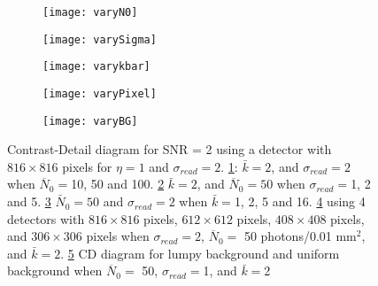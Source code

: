 \begin{figure}[ht]
	\begin{subfigure}[b]{0.3\linewidth}
		\label{fig:varyN0}
		\texttt{[image: varyN0]}
	\end{subfigure}
	\hspace{0.2cm}
	\begin{subfigure}[b]{0.3\linewidth}
		\label{fig:varySigma}
		\texttt{[image: varySigma]}
	\end{subfigure}
	\hspace{0.2cm}
	\begin{subfigure}[b]{0.3\linewidth}
		\label{fig:varykbar}
		\texttt{[image: varykbar]}
	\end{subfigure}
	
	\begin{subfigure}[b]{0.3\linewidth}
		\label{fig:varyPixel}
		\texttt{[image: varyPixel]}
	\end{subfigure}
	\hspace{0.2cm}
	\begin{subfigure}[b]{0.3\linewidth}
		\label{fig:varyBG}
		\texttt{[image: varyBG]}
	\end{subfigure}
\caption{Contrast-Detail diagram for SNR = 2 using a detector with $816 \times 816$ pixels for $\eta = 1$ and $\sigma_{read} = 2$.  \ref{fig:varyN0}: $\bar{k} = 2$, and $\sigma_{read} = 2$ when $\overline{N}_0 = $10, 50 and 100.  \ref{fig:varySigma} $\bar{k} = 2$, and $\overline{N}_0 = 50$ when $ \sigma_{read} = $1, 2 and 5.  \ref{fig:varykbar} $\bar{N}_0 = 50$ and $\sigma_{read} = 2$ when $\bar{k} = $1, 2, 5 and 16.  \ref{fig:varyPixel} using 4 detectors with $816 \times 816$ pixels, $612 \times 612$ pixels, $408 \times 408$ pixels, and $306 \times 306$ pixels when $\sigma_{read} = 2$, $\overline{N}_0 =$ 50 photons/0.01 mm$^2$, and $\bar{k} = 2$. \ref{fig:varyBG} CD diagram for lumpy background and uniform background when $\overline{N}_0 =$ 50, $\sigma_{read} = $1, and $\bar{k} = $2}
\label{fig:CD} 
\end{figure}

